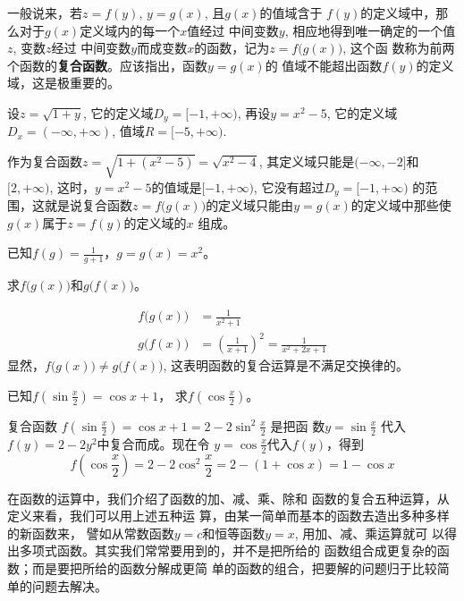 一般说来，若$z=f(y)$, $y=g(x)$, 且$g(x)$的值域含于
$f(y)$的定义域中，那么对于$g(x)$定义域内的每一个$x$值经过
中间变数$y$, 相应地得到唯一确定的一个值$z$, 变数$z$经过
中间变数$y$而成变数$x$的函数，记为$z=f\big(g(x)\big)$, 这个函
数称为前两个函数的\textbf{复合函数}。应该指出，函数$y=g(x)$的
值域不能超出函数$f(y)$的定义域，这是极重要的。


\begin{example}
    设$z=\sqrt{1+y}$, 它的定义域$D_y=[-1,+\infty)$,
再设$y=x^2-5$, 它的定义域$D_x=(-\infty,+\infty)$, 值域$R=
[-5,+\infty)$. 

作为复合函数$z=\sqrt{1+(x^2-5)}=\sqrt{x^2-4}$,
其定义域只能是$(-\infty,-2]$和$[2,+\infty)$, 这时，$y=x^2-
5$的值域是$[-1,+\infty)$, 它没有超过$D_y=[-1,+\infty)$
的范围，这就是说复合函数$z=f\big(g(x)\big)$的定义域只能由$y=
g(x)$的定义域中那些使$g(x)$属于$z=f(y)$的定义域的$x$
组成。
\end{example}

\begin{example}
已知$f(g)=\frac{1}{g+1}$，$g=g(x)=x^2$。

求$f\big(g(x)\big)$和$g\big(f(x)\big)$。    
\end{example}

\begin{solution}
\[\begin{split}
    f\big(g(x)\big)&=\frac{1}{x^2+1}\\
    g\big(f(x)\big)&=\left(\frac{1}{x+1}\right)^2=\frac{1}{x^2+2x+1}
\end{split}\]
显然，$f\big(g(x)\big)\ne g\big(f(x)\big)$, 这表明函数的复合运算是不满足交换律的。
\end{solution}

\begin{example}
已知$f\left(\sin\frac{x}{2}\right)=\cos x+1$，
求$f\left(\cos\frac{x}{2}\right)$。
\end{example}    

\begin{solution}
    复合函数
$f\left(\sin\frac{x}{2}\right)=\cos x+1=2-2\sin^2\frac{x}{2}$
    是把函
    数$y=\sin\frac{x}{2}$
    代入$f(y)=2-2y^2$中复合而成。现在令
    $y=\cos\frac{x}{2}$代入$f(y)$，得到
\[f\left(\cos\frac{x}{2}\right)=2-2\cos^2\frac{x}{2}=2-(1+\cos x)=1-\cos x\]
\end{solution}    

在函数的运算中，我们介绍了函数的加、减、乘、除和
函数的复合五种运算，从定义来看，我们可以用上述五种运
算，由某一简单而基本的函数去造出多种多样的新函数来，
譬如从常数函数$y=c$和恒等函数$y=x$, 用加、减、乘运算就可
以得出多项式函数。其实我们常常要用到的，并不是把所给的
函数组合成更复杂的函数；而是要把所给的函数分解成更简
单的函数的组合，把要解的问题归于比较简单的问题去解决。


